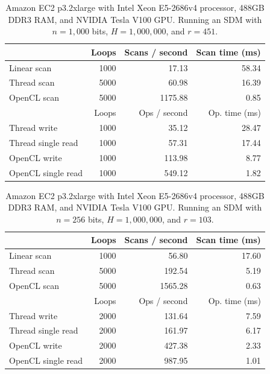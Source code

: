 \begin{table}[!htb]
\centering
\begin{tabular}{| l | r | r | r |}
    \hline
    & Loops & Scans / second & Scan time (ms) \\ \hline
    Linear scan & 1000 & 17.13 & 58.34 \\
    Thread scan & 5000 & 60.98 & 16.39 \\
    OpenCL scan & 5000 & 1175.88 & 0.85 \\ \hline
    \hline
    & Loops & Ops / second & Op. time (ms) \\ \hline
    Thread write & 1000 & 35.12 & 28.47 \\
    Thread single read & 1000 & 57.31 & 17.44 \\
    OpenCL write & 1000 & 113.98 & 8.77 \\
    OpenCL single read & 1000 & 549.12 & 1.82 \\
    \hline
\end{tabular}
\caption{Amazon EC2 p3.2xlarge with Intel Xeon E5-2686v4 processor, 488GB DDR3 RAM, and NVIDIA Tesla V100 GPU. Running an SDM with $n=1,000$ bits, $H=1,000,000$, and $r=451$.}
\end{table}

\begin{table}[!htb]
\centering
\begin{tabular}{| l | r | r | r |}
    \hline
    & Loops & Scans / second & Scan time (ms) \\ \hline
    Linear scan & 1000 & 56.80 & 17.60 \\
    Thread scan & 5000 & 192.54 & 5.19 \\
    OpenCL scan & 5000 & 1565.28 & 0.63 \\ \hline
    \hline
    & Loops & Ops / second & Op. time (ms) \\ \hline
    Thread write & 2000 & 131.64 & 7.59 \\
    Thread single read & 2000 & 161.97 & 6.17 \\
    OpenCL write & 2000 & 427.38 & 2.33 \\
    OpenCL single read & 2000 & 987.95 & 1.01 \\
    \hline
\end{tabular}
\caption{Amazon EC2 p3.2xlarge with Intel Xeon E5-2686v4 processor, 488GB DDR3 RAM, and NVIDIA Tesla V100 GPU. Running an SDM with $n=256$ bits, $H=1,000,000$, and $r=103$.}
\end{table}

